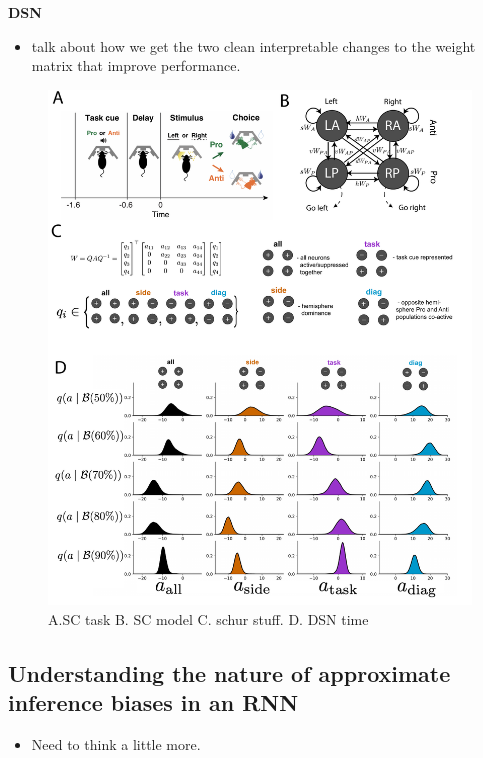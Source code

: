 \documentclass[11pt]{article}
\begin{document}
\textbf{DSN}
\begin{itemize}
\item talk about how we get the two clean interpretable changes to the weight matrix that improve performance. 
\end{itemize}

\begin{figure}
\begin{center}
\includegraphics[scale=0.4]{figs/fig4/fig4.pdf}
\end{center}
\caption{A.SC task B. SC model C. schur stuff. D. DSN time}
\end{figure}

\subsection{Understanding the nature of approximate inference biases in an RNN}
\begin{itemize}
\item Need to think a little more.
\end{itemize}
\end{document}
